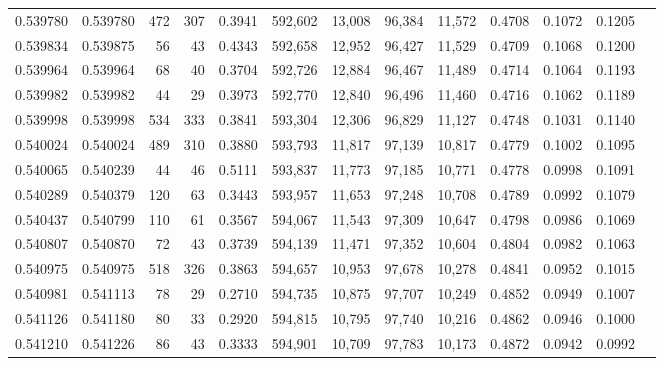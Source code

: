\begin{tabular}{rrrrrrrrrrrrr}
0.539780 & 0.539780 &   472 &   307 &                                     0.3941 & 592,602 &  13,008 &  96,384 &  11,572 & 0.4708 & 0.1072 & 0.1205 \\
0.539834 & 0.539875 &    56 &    43 &                                     0.4343 & 592,658 &  12,952 &  96,427 &  11,529 & 0.4709 & 0.1068 & 0.1200 \\
0.539964 & 0.539964 &    68 &    40 &                                     0.3704 & 592,726 &  12,884 &  96,467 &  11,489 & 0.4714 & 0.1064 & 0.1193 \\
0.539982 & 0.539982 &    44 &    29 &                                     0.3973 & 592,770 &  12,840 &  96,496 &  11,460 & 0.4716 & 0.1062 & 0.1189 \\
0.539998 & 0.539998 &   534 &   333 &                                     0.3841 & 593,304 &  12,306 &  96,829 &  11,127 & 0.4748 & 0.1031 & 0.1140 \\
0.540024 & 0.540024 &   489 &   310 &                                     0.3880 & 593,793 &  11,817 &  97,139 &  10,817 & 0.4779 & 0.1002 & 0.1095 \\
0.540065 & 0.540239 &    44 &    46 &                                     0.5111 & 593,837 &  11,773 &  97,185 &  10,771 & 0.4778 & 0.0998 & 0.1091 \\
0.540289 & 0.540379 &   120 &    63 &                                     0.3443 & 593,957 &  11,653 &  97,248 &  10,708 & 0.4789 & 0.0992 & 0.1079 \\
0.540437 & 0.540799 &   110 &    61 &                                     0.3567 & 594,067 &  11,543 &  97,309 &  10,647 & 0.4798 & 0.0986 & 0.1069 \\
0.540807 & 0.540870 &    72 &    43 &                                     0.3739 & 594,139 &  11,471 &  97,352 &  10,604 & 0.4804 & 0.0982 & 0.1063 \\
0.540975 & 0.540975 &   518 &   326 &                                     0.3863 & 594,657 &  10,953 &  97,678 &  10,278 & 0.4841 & 0.0952 & 0.1015 \\
0.540981 & 0.541113 &    78 &    29 &                                     0.2710 & 594,735 &  10,875 &  97,707 &  10,249 & 0.4852 & 0.0949 & 0.1007 \\
0.541126 & 0.541180 &    80 &    33 &                                     0.2920 & 594,815 &  10,795 &  97,740 &  10,216 & 0.4862 & 0.0946 & 0.1000 \\
0.541210 & 0.541226 &    86 &    43 &                                     0.3333 & 594,901 &  10,709 &  97,783 &  10,173 & 0.4872 & 0.0942 & 0.0992 \\

\end{tabular}
